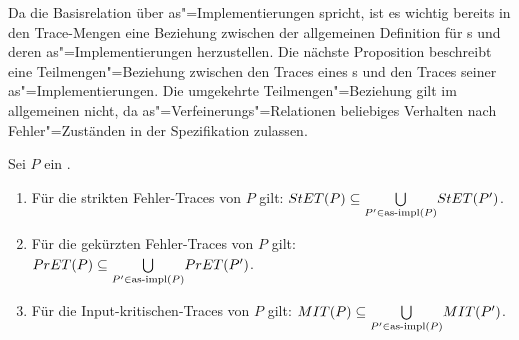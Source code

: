 Da die Basisrelation über as"=Implementierungen spricht, ist es wichtig bereits
in den Trace-Mengen eine Beziehung zwischen der allgemeinen Definition für
\MEIO{}s und deren as"=Implementierungen herzustellen. Die nächste Proposition
beschreibt eine Teilmengen"=Beziehung zwischen den Traces eines \MEIO{}s und
den Traces seiner as"=Implementierungen. Die umgekehrte Teilmengen"=Beziehung
gilt im allgemeinen nicht, da as"=Verfeinerungs"=Relationen beliebiges
Verhalten nach Fehler"=Zuständen in der Spezifikation zulassen.

\begin{Prop}
  \label{KommTracesProp}
  Sei $P$ ein \MEIO{}.
  \begin{enumerate}
    \item Für die strikten Fehler-Traces von $P$ gilt: $StET (P) \subseteq
      \underset{P' \in\mathrm{as}\text{-}\mathrm{impl} (P)}{\bigcup} StET (P')$.
    \item Für die gekürzten Fehler-Traces von $P$ gilt: $PrET (P) \subseteq
      \underset{P' \in\mathrm{as}\text{-}\mathrm{impl} (P)}{\bigcup} PrET (P')$.
    \item Für die Input-kritischen-Traces von $P$ gilt: $MIT (P) \subseteq
      \underset{P' \in\mathrm{as}\text{-}\mathrm{impl} (P)}{\bigcup} MIT (P')$.
  \end{enumerate}
\end{Prop}
